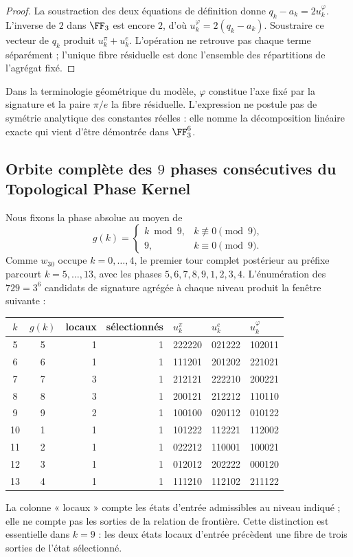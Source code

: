 \begin{proof}
La soustraction des deux équations de définition donne
\(q_k-a_k=2u_k^\varphi\). L'inverse de \(2\) dans \(\FF_3\) est encore
\(2\), d'où
\(u_k^\varphi=2(q_k-a_k)\). Soustraire ce vecteur de \(q_k\) produit
\(u_k^\pi+u_k^e\). L'opération ne retrouve pas chaque terme séparément ;
l'unique fibre résiduelle est donc l'ensemble des répartitions de l'agrégat fixé.
\end{proof}

Dans la terminologie géométrique du modèle, \(\varphi\) constitue l'axe
fixé par la signature et la paire \(\pi/e\) la fibre résiduelle. L'expression ne
postule pas de symétrie analytique des constantes réelles : elle nomme la
décomposition linéaire exacte qui vient d'être démontrée dans \(\FF_3^6\).
\fi

\subsection{Orbite complète des \(9\) phases consécutives du Topological Phase Kernel}

Nous fixons la phase absolue au moyen de
\[
g(k)=
\begin{cases}
k\bmod9,&k\not\equiv0\pmod9,\\
9,&k\equiv0\pmod9.
\end{cases}
\]
Comme \(w_{30}\) occupe \(k=0,\ldots,4\), le premier tour complet postérieur
au préfixe parcourt \(k=5,\ldots,13\), avec les phases
\(5,6,7,8,9,1,2,3,4\). L'énumération des \(729=3^6\) candidats de
signature agrégée à chaque niveau produit la fenêtre suivante :
\begin{center}
\small
\begin{tabular}{@{}ccrrlll@{}}
\toprule
\(k\)&\(g(k)\)&locaux&sélectionnés&\(u_k^\pi\)&\(u_k^e\)&\(u_k^\varphi\)\\
\midrule
5&5&1&1&222220&021222&102011\\
6&6&1&1&111201&201202&221021\\
7&7&3&1&212121&222210&200221\\
8&8&3&1&200121&212212&110110\\
9&9&2&1&100100&020112&010122\\
10&1&1&1&101222&112221&112002\\
11&2&1&1&022212&110001&100021\\
12&3&1&1&012012&202222&000120\\
13&4&1&1&111210&112102&211122\\
\bottomrule
\end{tabular}
\end{center}
La colonne « locaux » compte les états d'entrée admissibles au niveau
indiqué ; elle ne compte pas les sorties de la relation de frontière. Cette distinction
est essentielle dans \(k=9\) : les deux états locaux d'entrée précèdent une
fibre de trois sorties de l'état sélectionné.

